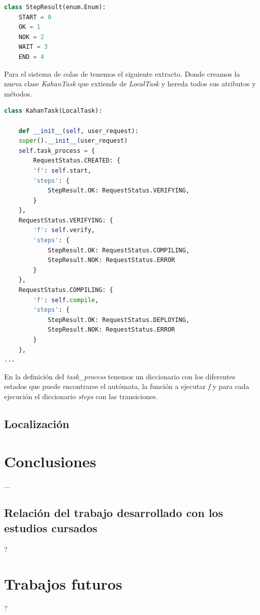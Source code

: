 \documentclass[11pt,spanish,listoffigures,listoftables]{tfgetsinf}
\begin{document}
\begin{lstlisting}[language=python]
class StepResult(enum.Enum):
	START = 0
	OK = 1
	NOK = 2
	WAIT = 3
	END = 4
\end{lstlisting}

Para el sistema de \Gls{cola}s de \kahan tenemos el siguiente extracto. Donde creamos la nueva clase \textit{KahanTask} que extiende de \textit{LocalTask} y hereda todos sus atributos y métodos.

\begin{lstlisting}[language=python]
class KahanTask(LocalTask):

	def __init__(self, user_request):
	super().__init__(user_request)
	self.task_process = {
		RequestStatus.CREATED: {
		'f': self.start,
		'steps': {
			StepResult.OK: RequestStatus.VERIFYING,
		}
	},
	RequestStatus.VERIFYING: {
		'f': self.verify,
		'steps': {
			StepResult.OK: RequestStatus.COMPILING,
			StepResult.NOK: RequestStatus.ERROR
		}
	},
	RequestStatus.COMPILING: {
		'f': self.compile,
		'steps': {
			StepResult.OK: RequestStatus.DEPLOYING,
			StepResult.NOK: RequestStatus.ERROR
		}
	},
...
\end{lstlisting}

En la definición del \textit{task\_process} tenemos un diccionario con los diferentes estados que puede encontrarse el autómata, la función a ejecutar \textit{f} y para cada ejecución el diccionario \textit{steps} con las transiciones.

\section{Localización}

\chapter{Conclusiones}

... \par

\section{Relación del trabajo desarrollado con los estudios cursados}

?

\chapter{Trabajos futuros}

?
\end{document}
